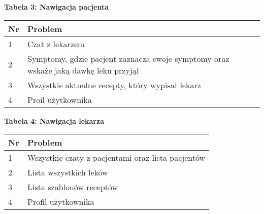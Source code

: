 \textbf{Tabela 3: Nawigacja pacjenta}
\begin{table}[h]
  \begin{tabular}{|p{1cm}|p{\dimexpr\textwidth-1cm\relax}|} \hline
    \textbf{Nr} & \textbf{Problem} \\\hline
    1 & Czat z lekarzem \\\hline
    2 & Symptomy, gdzie pacjent zaznacza swoje symptomy oraz wskaże jaką dawkę leku przyjął \\\hline
    3 & Wszystkie aktualne recepty, który wypisał lekarz \\\hline
    4 & Proil użytkownika \\\hline
  \end{tabular}
\end{table}

\newpage

\textbf{Tabela 4: Nawigacja lekarza}
\begin{table}[h]
  \begin{tabular}{|p{1cm}|p{\dimexpr\textwidth-1cm\relax}|} \hline
    \textbf{Nr} & \textbf{Problem} \\\hline
    1 & Wszystkie czaty z pacjentami oraz lista pacjentów \\\hline
    2 & Lista wszystkich leków \\\hline
    3 & Lista szablonów receptów \\\hline
    4 & Profil użytkownika \\\hline
  \end{tabular}
\end{table}
